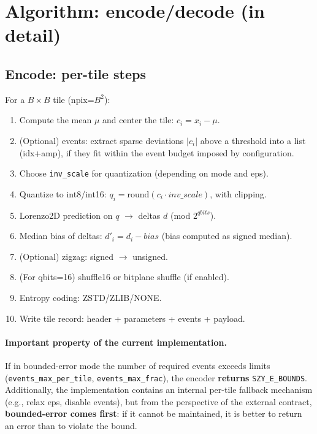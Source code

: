 \documentclass[11pt,a4paper]{article}
\begin{document}
\section{Algorithm: encode/decode (in detail)}

\subsection{Encode: per-tile steps}
For a $B\times B$ tile (npix=$B^2$):
\begin{enumerate}
  \item Compute the mean $\mu$ and center the tile: $c_i = x_i - \mu$.
  \item (Optional) events: extract sparse deviations $|c_i|$ above a threshold into a list (idx+amp), if they fit within the event budget imposed by configuration.
  \item Choose \texttt{inv\_scale} for quantization (depending on mode and eps).
  \item Quantize to int8/int16: $q_i = \mathrm{round}(c_i\cdot inv\_scale)$, with clipping.
  \item Lorenzo2D prediction on $q$ $\rightarrow$ deltas $d$ (mod $2^{qbits}$).
  \item Median bias of deltas: $d'_i = d_i - bias$ (bias computed as signed median).
  \item (Optional) zigzag: signed $\rightarrow$ unsigned.
  \item (For qbits=16) shuffle16 or bitplane shuffle (if enabled).
  \item Entropy coding: ZSTD/ZLIB/NONE.
  \item Write tile record: header + parameters + events + payload.
\end{enumerate}

\paragraph{Important property of the current implementation.}
If in bounded-error mode the number of required events exceeds limits (\texttt{events\_max\_per\_tile}, \texttt{events\_max\_frac}), the encoder \textbf{returns} \texttt{SZY\_E\_BOUNDS}. Additionally, the implementation contains an internal per-tile fallback mechanism (e.g., relax eps, disable events), but from the perspective of the external contract, \textbf{bounded-error comes first}: if it cannot be maintained, it is better to return an error than to violate the bound.
\end{document}

